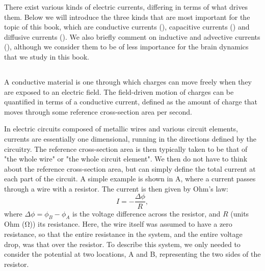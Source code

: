 There exist various kinds of electric currents, differing in terms of what drives them. Below we will introduce the three kinds that are most important for the topic of this book, which are conductive currents (),  capacitive currents () and diffusive currents (). We also briefly comment on inductive and advective currents (), although we consider them to be of less importance for the brain dynamics that we study in this book. 


\subsection{}
\label{sec:Basics:ConductiveCurrent}
A conductive material  is one through which charges can move freely when they are exposed to an electric field. The field-driven motion of charges can be quantified in terms of a conductive current, defined as the amount of charge that moves through some reference cross-section area per second.

In electric circuits composed of metallic wires and various circuit elements, currents are essentially one dimensional, running in the directions defined by the circuitry. The reference cross-section area is then typically taken to be that of "the whole wire" or "the whole circuit element". We then do not have to think about the reference cross-section area, but can simply define the total current at each part of the circuit. A simple example is shown in A, where a current passes through a wire with a resistor. The current is then given by Ohm's law:
\begin{equation}
I = - \frac{\Delta \phi}{R},
\label{eq:Basics:Ohm_R}
\end{equation}
where $\Delta \phi = \phi_B-\phi_A$ is the voltage difference across the resistor, and $R$ (units Ohm (\si{\ohm})) its resistance. Here, the wire itself was assumed to have a zero resistance, so that the entire resistance in the system, and the entire voltage drop, was that over the resistor. To describe this system, we only needed to consider the potential at two locations, A and B, representing the two sides of the resistor.

